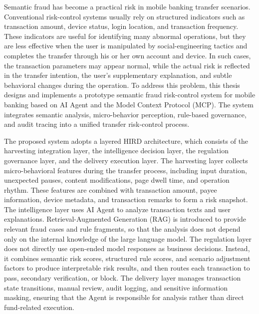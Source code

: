 Semantic fraud has become a practical risk in mobile banking transfer scenarios. Conventional risk-control systems usually rely on structured indicators such as transaction amount, device status, login location, and transaction frequency. These indicators are useful for identifying many abnormal operations, but they are less effective when the user is manipulated by social-engineering tactics and completes the transfer through his or her own account and device. In such cases, the transaction parameters may appear normal, while the actual risk is reflected in the transfer intention, the user's supplementary explanation, and subtle behavioral changes during the operation. To address this problem, this thesis designs and implements a prototype semantic fraud risk-control system for mobile banking based on AI Agent and the Model Context Protocol (MCP). The system integrates semantic analysis, micro-behavior perception, rule-based governance, and audit tracing into a unified transfer risk-control process.

The proposed system adopts a layered HIRD architecture, which consists of the harvesting integration layer, the intelligence decision layer, the regulation governance layer, and the delivery execution layer. The harvesting layer collects micro-behavioral features during the transfer process, including input duration, unexpected pauses, content modifications, page dwell time, and operation rhythm. These features are combined with transaction amount, payee information, device metadata, and transaction remarks to form a risk snapshot. The intelligence layer uses AI Agent to analyze transaction texts and user explanations. Retrieval-Augmented Generation (RAG) is introduced to provide relevant fraud cases and rule fragments, so that the analysis does not depend only on the internal knowledge of the large language model. The regulation layer does not directly use open-ended model responses as business decisions. Instead, it combines semantic risk scores, structured rule scores, and scenario adjustment factors to produce interpretable risk results, and then routes each transaction to pass, secondary verification, or block. The delivery layer manages transaction state transitions, manual review, audit logging, and sensitive information masking, ensuring that the Agent is responsible for analysis rather than direct fund-related execution.

